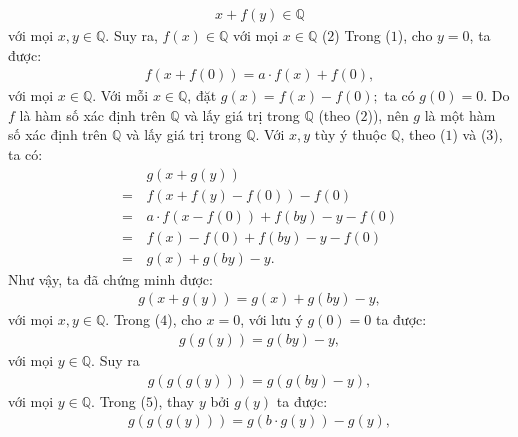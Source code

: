 \begin{multicols}{2}
	\begin{align*}
		x + f(y) \in \mathbb{Q}
	\end{align*}
	với mọi  $x, y \in \mathbb{Q}$.
	\vskip 0.05cm
	Suy ra, $f(x) \in \mathbb{Q}$  với mọi $x \in \mathbb{Q}$ \hfill ($2$)
	\vskip 0.05cm
	Trong ($1$), cho $y = 0$, ta được:
	\begin{align*}
		f\left( {x + f\left( 0 \right)} \right) = a \cdot f\left( x \right) + f\left( 0 \right), \tag{$3$}
	\end{align*}
	với mọi $x \in \mathbb{Q}$.
	\vskip 0.05cm
	Với mỗi  $x \in \mathbb{Q}$, đặt $g\left( x \right) = f\left( x \right) - f\left( 0 \right);$  ta có $g(0) = 0$.
	\vskip 0.05cm 
	Do $f$  là hàm số xác định trên $\mathbb{Q}$ và lấy giá trị trong  $\mathbb{Q}$ (theo ($2$)), nên $g$ là một hàm số xác định trên  $\mathbb{Q}$ và lấy giá trị trong $\mathbb{Q}$.
	\vskip 0.05cm
	Với $x, y$ tùy ý thuộc  $\mathbb{Q}$, theo ($1$) và ($3$), ta có:
	\begin{align*}
			&g\left( {x + g\left( y \right)} \right) \\
			= \,&f\left( {x + f\left( y \right) - f\left( 0 \right)} \right) - f\left( 0 \right) \\
			= \,&a \cdot f\left( {x - f\left( 0 \right)} \right) + f\left( {by} \right) - y - f\left( 0 \right)\\
			 = \,&f\left( x \right) - f\left( 0 \right) + f\left( {by} \right) - y - f\left( 0 \right) \\
			 = \,&g\left( x \right) + g\left( {by} \right) - y.
	\end{align*}
	Như vậy, ta đã chứng minh được:
	\begin{align*}
		g\left( {x + g\left( y \right)} \right) = g\left( x \right) + g\left( {by} \right) - y, \tag{$4$}
	\end{align*}
	với mọi $x,y \in \mathbb{Q}$.
	\vskip 0.05cm
	Trong ($4$), cho $x = 0$, với lưu ý $g(0) = 0$  ta được:
	\begin{align*}
		g\left( {g\left( y \right)} \right) = g\left( {by} \right) - y, \tag{$5$}
	\end{align*}
	với mọi $y \in \mathbb{Q}$. Suy ra
	\begin{align*}
		g\left( {g\left( {g\left( y \right)} \right)} \right) = g\left( {g\left( {by} \right) - y} \right), \tag{$6$}
	\end{align*}
	với mọi $y \in \mathbb{Q}$.
	\vskip 0.05cm
	Trong ($5$), thay $y$ bởi  $g(y)$ ta được:
	\begin{align*}
		g\left( {g\left( {g\left( y \right)} \right)} \right) = g\left( {b \cdot g\left( y \right)} \right) - g\left( y \right), \tag{$7$}

\end{align*}
\end{multicols}
